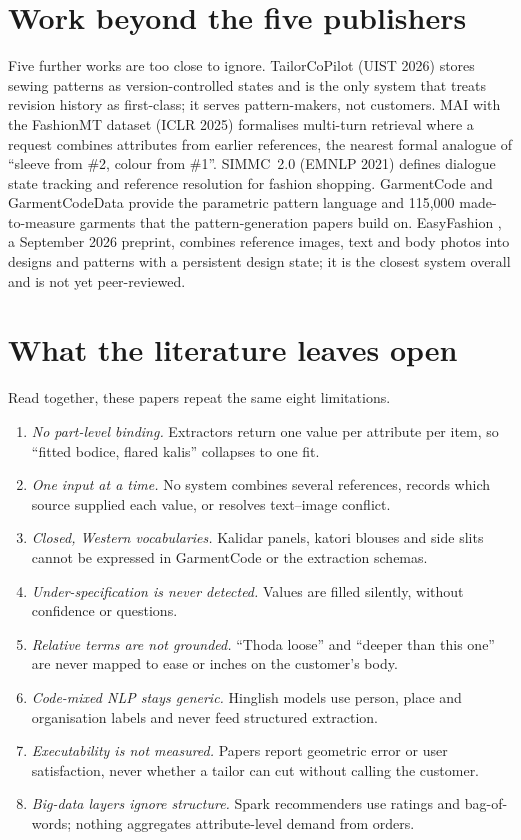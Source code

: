 \section{Work beyond the five publishers}\label{sec:beyond}

Five further works are too close to ignore. TailorCoPilot \cite{sun2026tailorcopilot} (UIST 2026) stores sewing patterns as version-controlled states and is the only system that treats revision history as first-class; it serves pattern-makers, not customers. MAI with the FashionMT dataset \cite{chen2025mai} (ICLR 2025) formalises multi-turn retrieval where a request combines attributes from earlier references, the nearest formal analogue of ``sleeve from \#2, colour from \#1''. SIMMC~2.0 \cite{kottur2021simmc} (EMNLP 2021) defines dialogue state tracking and reference resolution for fashion shopping. GarmentCode \cite{korosteleva2023garmentcode} and GarmentCodeData \cite{korosteleva2024gcd} provide the parametric pattern language and 115,000 made-to-measure garments that the pattern-generation papers build on. EasyFashion \cite{qu2026easyfashion}, a September 2026 preprint, combines reference images, text and body photos into designs and patterns with a persistent design state; it is the closest system overall and is not yet peer-reviewed.

\section{What the literature leaves open}

Read together, these papers repeat the same eight limitations.

\begin{enumerate}
\item \emph{No part-level binding.} Extractors return one value per attribute per item, so ``fitted bodice, flared kalis'' collapses to one fit.
\item \emph{One input at a time.} No system combines several references, records which source supplied each value, or resolves text--image conflict.
\item \emph{Closed, Western vocabularies.} Kalidar panels, katori blouses and side slits cannot be expressed in GarmentCode or the extraction schemas.
\item \emph{Under-specification is never detected.} Values are filled silently, without confidence or questions.
\item \emph{Relative terms are not grounded.} ``Thoda loose'' and ``deeper than this one'' are never mapped to ease or inches on the customer's body.
\item \emph{Code-mixed NLP stays generic.} Hinglish models use person, place and organisation labels and never feed structured extraction.
\item \emph{Executability is not measured.} Papers report geometric error or user satisfaction, never whether a tailor can cut without calling the customer.
\item \emph{Big-data layers ignore structure.} Spark recommenders use ratings and bag-of-words; nothing aggregates attribute-level demand from orders.
\end{enumerate}

